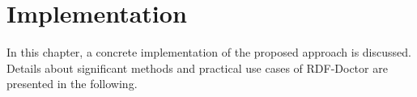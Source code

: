 \chapter{Implementation}
\label{ch:implementation}


In this chapter, a concrete implementation of the proposed approach is discussed. 
Details about significant methods and practical use cases of RDF-Doctor  are presented in the following.  
 




 

